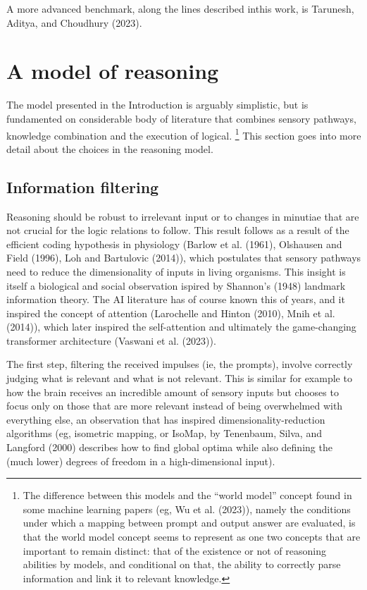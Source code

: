 \documentclass[
]{article}
\begin{document}
A more advanced benchmark, along the lines described inthis work, is
Tarunesh, Aditya, and Choudhury (2023).

\section{A model of reasoning}\label{a-model-of-reasoning}

The model presented in the Introduction is arguably simplistic, but is
fundamented on considerable body of literature that combines sensory
pathways, knowledge combination and the execution of logical.
\footnote{The difference between this models and the ``world model''
  concept found in some machine learning papers (eg, Wu et al. (2023)),
  namely the conditions under which a mapping between prompt and output
  answer are evaluated, is that the world model concept seems to
  represent as one two concepts that are important to remain distinct:
  that of the existence or not of reasoning abilities by models, and
  conditional on that, the ability to correctly parse information and
  link it to relevant knowledge.} This section goes into more detail
about the choices in the reasoning model.

\subsection{Information filtering}\label{information-filtering}

Reasoning should be robust to irrelevant input or to changes in minutiae
that are not crucial for the logic relations to follow. This result
follows as a result of the efficient coding hypothesis in physiology
(Barlow et al. (1961), Olshausen and Field (1996), Loh and Bartulovic
(2014)), which postulates that sensory pathways need to reduce the
dimensionality of inputs in living organisms. This insight is itself a
biological and social observation ispired by Shannon's (1948) landmark
information theory. The AI literature has of course known this of years,
and it inspired the concept of attention (Larochelle and Hinton (2010),
Mnih et al. (2014)), which later inspired the self-attention and
ultimately the game-changing transformer architecture (Vaswani et al.
(2023)).

The first step, filtering the received impulses (ie, the prompts),
involve correctly judging what is relevant and what is not relevant.
This is similar for example to how the brain receives an incredible
amount of sensory inputs but chooses to focus only on those that are
more relevant instead of being overwhelmed with everything else, an
observation that has inspired dimensionality-reduction algorithms (eg,
isometric mapping, or IsoMap, by Tenenbaum, Silva, and Langford (2000)
describes how to find global optima while also defining the (much lower)
degrees of freedom in a high-dimensional input).
\end{document}
